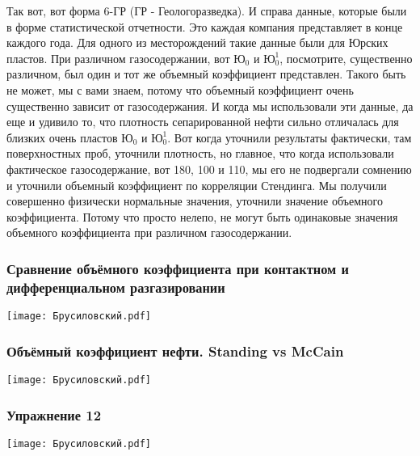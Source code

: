 \documentclass[main.tex]{subfiles}
\begin{document}
Так вот, вот форма 6-ГР (ГР - Геологоразведка).
И справа данные, которые были в форме статистической отчетности.
Это каждая компания представляет в конце каждого года.
Для одного из месторождений такие данные были для Юрских пластов.
При различном газосодержании, вот $\text{Ю}_0$ и $\text{Ю}_0^1$, посмотрите, существенно различном, был один и тот же объемный коэффициент представлен.
Такого быть не может, мы с вами знаем, потому что объемный коэффициент очень существенно зависит от газосодержания.
И когда мы использовали эти данные, да еще и удивило то, что плотность сепарированной нефти сильно отличалась для близких очень пластов $\text{Ю}_0$ и $\text{Ю}_0^1$.
Вот когда уточнили результаты фактически, там поверхностных проб, уточнили плотность, но главное, что когда использовали фактическое газосодержание, вот 180, 100 и 110, мы его не подвергали сомнению и уточнили объемный коэффициент по корреляции Стендинга.
Мы получили совершенно физически нормальные значения, уточнили значение объемного коэффициента.
Потому что просто нелепо, не могут быть одинаковые значения объемного коэффициента при различном газосодержании.

\subsubsection{Сравнение объёмного коэффициента при контактном и дифференциальном разгазировании}

\begin{center}
\texttt{[image: Брусиловский.pdf]}
\end{center}



\subsubsection{Объёмный коэффициент нефти. Standing vs McCain}

\begin{center}
\texttt{[image: Брусиловский.pdf]}
\end{center}



\subsubsection{Упражнение 12}

\begin{center}
\texttt{[image: Брусиловский.pdf]}
\end{center}
\end{document}
